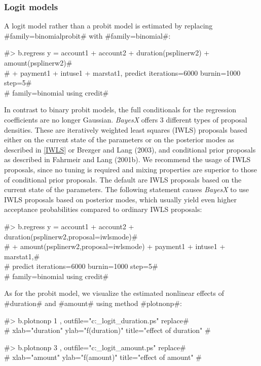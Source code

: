 \clearpage

\subsubsection{Logit models}

A logit model rather than a probit model is estimated by replacing
#family=binomialprobit# with #family=binomial#:

#> b.regress  y = account1 + account2 + duration(psplinerw2) + amount(psplinerw2)# \\
#  + payment1 + intuse1 + marstat1, predict iterations=6000 burnin=1000 step=5# \\
#  family=binomial using credit#

In contrast to binary probit models, the full conditionals for the
regression coefficients are no longer Gaussian. {\em BayesX}
offers 3 different types of proposal densities. These are
iteratively weighted least squares (IWLS) proposals based either
on the current state of the parameters or on the posterior modes
as described in \autoref{IWLS} or Brezger and Lang (2003), and
conditional prior proposals as described in Fahrmeir and Lang
(2001b). We recommend the usage of IWLS proposals, since no tuning
is required and mixing properties are superior to those of
conditional prior proposals. The default are IWLS proposals based
on the current state of the parameters. The following statement
causes {\em BayesX} to use IWLS proposals based on posterior
modes, which usually yield even higher acceptance probabilities
compared to ordinary IWLS proposals:

#> b.regress  y = account1 + account2 + duration(psplinerw2,proposal=iwlsmode)# \\
#  + amount(psplinerw2,proposal=iwlsmode) + payment1 + intuse1 + marstat1,# \\
#  predict iterations=6000 burnin=1000 step=5# \\
#  family=binomial using credit#

As for the probit model, we visualize the estimated nonlinear
effects of #duration# and #amount# using method #plotnonp#:

#> b.plotnonp 1 , outfile="c:\results\credit_logit_duration.ps" replace# \\
#  xlab="duration" ylab="f(duration)" title="effect of duration" #

#> b.plotnonp 3 , outfile="c:\results\credit_logit_amount.ps" replace# \\
#  xlab="amount" ylab="f(amount)" title="effect of amount" #

